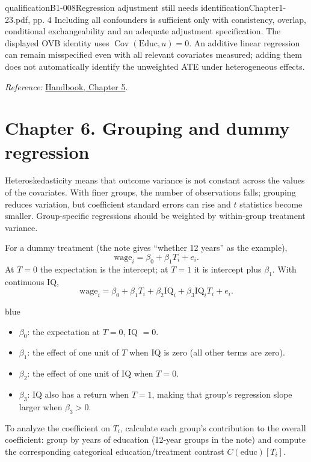 {\begin{reviewnote}{qualification}{B1-008}{Regression adjustment still needs identification}{Chapter1-23.pdf, pp. 4}
Including all confounders is sufficient only with consistency, overlap, conditional exchangeability and an adequate adjustment specification. The displayed OVB identity uses $\operatorname{Cov}(\mathrm{Educ},u)=0$. An additive linear regression can remain misspecified even with all relevant covariates measured; adding them does not automatically identify the unweighted ATE under heterogeneous effects.
\par\smallskip\textit{Reference:} \href{https://matheusfacure.github.io/python-causality-handbook/05-The-Unreasonable-Effectiveness-of-Linear-Regression.html}{Handbook, Chapter 5}.
\end{reviewnote}
\section{Chapter 6. Grouping and dummy regression}
Heteroskedasticity means that outcome variance is not constant across the values of the covariates. With finer groups, the number of observations falls; grouping reduces variation, but coefficient standard errors can rise and $t$ statistics become smaller. Group-specific regressions should be weighted by within-group treatment variance.

For a dummy treatment (the note gives ``whether 12 years'' as the example),
\[\mathrm{wage}_i=\beta_0+\beta_1T_i+e_i.\]
At $T=0$ the expectation is the intercept; at $T=1$ it is intercept plus $\beta_1$. With continuous IQ,
\[\mathrm{wage}_i=\beta_0+\beta_1T_i+\beta_2\mathrm{IQ}_i+\beta_3\mathrm{IQ}_iT_i+e_i.\]
\begin{inkblock}{blue}
\begin{itemize}
\item $\beta_0$: the expectation at $T=0$, IQ $=0$.
\item $\beta_1$: the effect of one unit of $T$ when IQ is zero (all other terms are zero).
\item $\beta_2$: the effect of one unit of IQ when $T=0$.
\item $\beta_3$: IQ also has a return when $T=1$, making that group's regression slope larger when $\beta_3>0$.
\end{itemize}
\end{inkblock}
To analyze the coefficient on $T_i$, calculate each group's contribution to the overall coefficient: group by years of education (12-year groups in the note) and compute the corresponding categorical education/treatment contrast $C(\mathrm{educ})[T_i]$.

}

